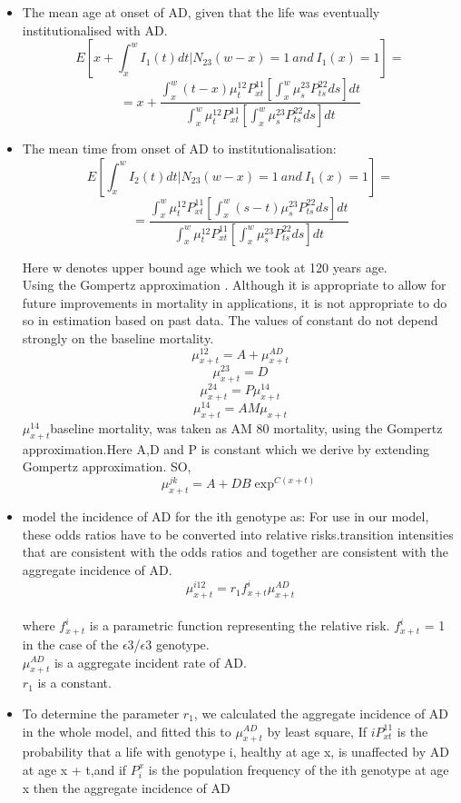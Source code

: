 \documentclass{article}
\begin{document}
\begin{itemize}
\item The mean age at onset of AD, given that the life was eventually institutionalised with AD.
\[E[x+\int_{x}^{w}I_1(t)dt | N_{23}(w-x) = 1\ and\ I_1(x) =1 ] = \]
\[=x + \frac{\int_{x}^{w}(t-x)\mu_t^{12}P_{xt}^{11}[\int_{x}^{w}\mu_{s}^{23}P_{ts}^{22}ds]dt}{\int_{x}^{w}\mu_t^{12}P_{xt}^{11}[\int_{x}^{w}\mu_s^{23}P_{ts}^{22}ds]dt }\]

\item The mean time from onset of AD to institutionalisation:
\[E[\int_{x}^{w}I_2(t)dt | N_{23}(w-x) = 1\ and\ I_1(x) =1 ] = \]
\[= \frac{\int_{x}^{w}\mu_t^{12}P_{xt}^{11}[\int_{x}^{w}(s-t)\mu_{s}^{23}P_{ts}^{22}ds]dt}{\int_{x}^{w}\mu_t^{12}P_{xt}^{11}[\int_{x}^{w}\mu_s^{23}P_{ts}^{22}ds]dt }\]

Here w denotes upper bound age which we took at 120 years age.
\\ Using the Gompertz approximation . Although it is appropriate to allow for future improvements in mortality in applications, it is not appropriate to do so in estimation based on past data. The values of constant do not depend strongly on the baseline mortality.
\[\mu_{x+t}^{12} = A +\mu_{x+t}^{AD} \]
\[\mu_{x+t}^{23} = D\]
\[\mu_{x+t}^{24} = P\mu_{x+t}^{14}\]
\[\mu_{x+t}^{14} = AM\mu_{x+t}  \]
$\mu_{x+t}^{14}$baseline mortality, was taken as AM 80 mortality, using the Gompertz approximation.Here A,D and P is constant which we derive by extending  Gompertz approximation.   
SO, \[\mu_{x+t}^{jk}=A + DB\exp^{C(x+t)}\] 
\item  model the incidence of AD for the ith genotype as:
For use in our model, these odds ratios have to be converted into relative risks.transition intensities that are consistent with the odds ratios and together are consistent with the aggregate incidence of AD.
\[\mu_{x+t}^{i12} = r_1 f_{x+t}^{i}\mu_{x+t}^{AD} \]
\\where $f_{x+t}^{i}$ is a parametric function representing the relative risk. $f_{x+t}^{i}$  = 1 in the case of the $\epsilon$3/$\epsilon$3 genotype.
\\$\mu_{x+t}^{AD}$ is a aggregate incident rate of AD.
\\$r_1$ is a constant.
\item To determine the parameter $r_1$, we calculated the aggregate incidence of AD in the whole model, and fitted this to $\mu_{x+t}^{AD}$ by least square, If $ iP_{xt}^{11}$ is the probability that a life with genotype i, healthy at age x, is unaffected by AD at age x + t,and if $P_i^x$ is the population frequency of the ith genotype at age x then the aggregate incidence of AD 


\end{itemize}
\end{document}
